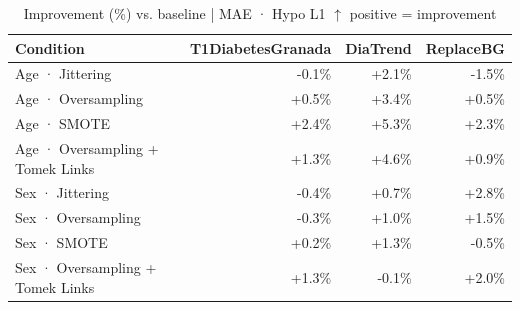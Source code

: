 \begin{table}[htbp]
\centering
\small
\caption{Improvement (\%) vs. baseline  |  MAE · Hypo L1  $\uparrow$ positive = improvement}
\label{tab:delta_mae_tbr_1_family_size_oversampling}
\begin{tabular}{lrrr}
\toprule
\textbf{Condition} & \textbf{T1DiabetesGranada} & \textbf{DiaTrend} & \textbf{ReplaceBG} \\
\midrule
Age · Jittering & \textcolor{BrickRed}{-0.1\%} & \textcolor{OliveGreen}{+2.1\%} & \textcolor{BrickRed}{-1.5\%} \\
Age · Oversampling & \textcolor{OliveGreen}{+0.5\%} & \textcolor{OliveGreen}{+3.4\%} & \textcolor{OliveGreen}{+0.5\%} \\
Age · SMOTE & \textcolor{OliveGreen}{+2.4\%} & \textcolor{OliveGreen}{+5.3\%} & \textcolor{OliveGreen}{+2.3\%} \\
Age · Oversampling + Tomek Links & \textcolor{OliveGreen}{+1.3\%} & \textcolor{OliveGreen}{+4.6\%} & \textcolor{OliveGreen}{+0.9\%} \\
\midrule
Sex · Jittering & \textcolor{BrickRed}{-0.4\%} & \textcolor{OliveGreen}{+0.7\%} & \textcolor{OliveGreen}{+2.8\%} \\
Sex · Oversampling & \textcolor{BrickRed}{-0.3\%} & \textcolor{OliveGreen}{+1.0\%} & \textcolor{OliveGreen}{+1.5\%} \\
Sex · SMOTE & \textcolor{OliveGreen}{+0.2\%} & \textcolor{OliveGreen}{+1.3\%} & \textcolor{BrickRed}{-0.5\%} \\
Sex · Oversampling + Tomek Links & \textcolor{OliveGreen}{+1.3\%} & \textcolor{BrickRed}{-0.1\%} & \textcolor{OliveGreen}{+2.0\%} \\
\bottomrule
\end{tabular}
\end{table}